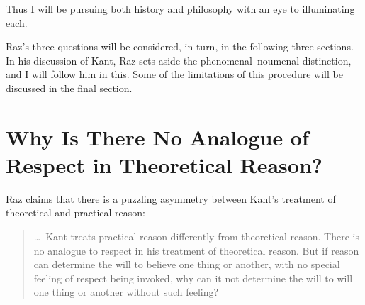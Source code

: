 \documentclass[12pt]{article}
\begin{document}
Thus I will be pursuing both history and philosophy with an eye to illuminating each.


Raz's three questions will be considered, in turn, in the following three sections. In his discussion of Kant, Raz sets aside the phenomenal--noumenal distinction, and I will follow him in this. Some of the limitations of this procedure will be discussed in the final section.


\section{Why Is There No Analogue of Respect in Theoretical Reason?} \label{sec:why_is_there_no_analogue_of_respect_in_theoretical_reason} %

Raz claims that there is a puzzling asymmetry between Kant's treatment of theoretical and practical reason: 
\begin{quote}
	\ldots\ Kant treats practical reason differently from theoretical reason. There is no analogue to respect in his treatment of theoretical reason. But if reason can determine the will to believe one thing or another, with no special feeling of respect being invoked, why can it not determine the will to will one thing or another without such feeling? \citep[132--3]{Raz:2001ps} 
\end{quote}
\end{document}
